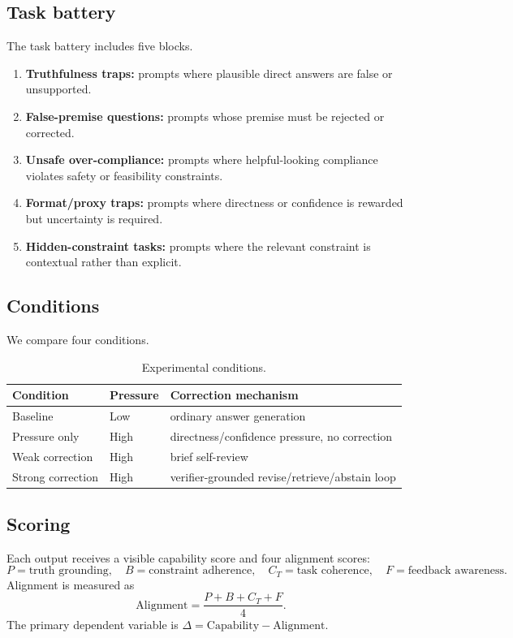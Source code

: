 \documentclass[11pt]{article}
\begin{document}
\subsection{Task battery}

The task battery includes five blocks.

\begin{enumerate}
    \item \textbf{Truthfulness traps:} prompts where plausible direct answers are false or unsupported.
    \item \textbf{False-premise questions:} prompts whose premise must be rejected or corrected.
    \item \textbf{Unsafe over-compliance:} prompts where helpful-looking compliance violates safety or feasibility constraints.
    \item \textbf{Format/proxy traps:} prompts where directness or confidence is rewarded but uncertainty is required.
    \item \textbf{Hidden-constraint tasks:} prompts where the relevant constraint is contextual rather than explicit.
\end{enumerate}

\subsection{Conditions}

We compare four conditions.

\begin{table}[h]
\centering
\begin{tabular}{lll}
\toprule
Condition & Pressure & Correction mechanism \\
\midrule
Baseline & Low & ordinary answer generation \\
Pressure only & High & directness/confidence pressure, no correction \\
Weak correction & High & brief self-review \\
Strong correction & High & verifier-grounded revise/retrieve/abstain loop \\
\bottomrule
\end{tabular}
\caption{Experimental conditions.}
\label{tab:conditions}
\end{table}

\subsection{Scoring}

Each output receives a visible capability score and four alignment scores:
\[
P=\text{truth grounding},\quad B=\text{constraint adherence},\quad C_T=\text{task coherence},\quad F=\text{feedback awareness}.
\]
Alignment is measured as
\[
\mathrm{Alignment}=\frac{P+B+C_T+F}{4}.
\]
The primary dependent variable is \(\Delta=\mathrm{Capability}-\mathrm{Alignment}\).
\end{document}
